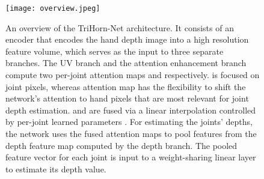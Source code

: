 \documentclass{article}
\begin{document}
\begin{figure}[t]
\centering
\texttt{[image: overview.jpeg]}
\caption{An overview of the TriHorn-Net architecture. It consists of an encoder that encodes the hand depth image into a high resolution feature volume, which serves as the input to three separate branches. The UV branch and the attention enhancement branch compute two per-joint attention maps  and  respectively.  is focused on joint pixels, whereas  attention map has the flexibility to shift the network's attention to hand pixels that are most relevant for joint depth estimation.  and  are fused via a linear interpolation controlled by per-joint learned parameters . For estimating the joints' depths, the network uses the fused attention maps  to pool features from the depth feature map  computed by the depth branch. The pooled feature vector for each joint is input to a weight-sharing linear layer to estimate its depth value.}
\label{fig:overview_main}
\end{figure}
\end{document}
